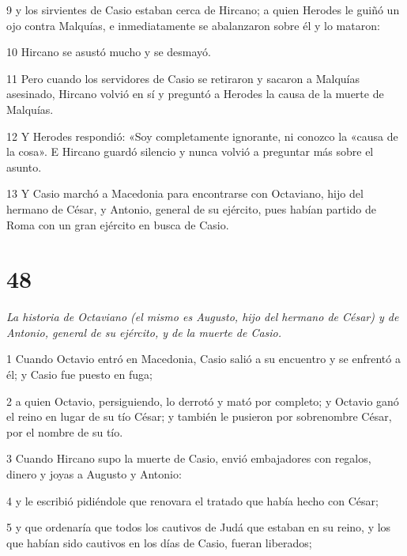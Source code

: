 \par 9 y los sirvientes de Casio estaban cerca de Hircano; a quien Herodes le guiñó un ojo contra Malquías, e inmediatamente se abalanzaron sobre él y lo mataron:

\par 10 Hircano se asustó mucho y se desmayó.

\par 11 Pero cuando los servidores de Casio se retiraron y sacaron a Malquías asesinado, Hircano volvió en sí y preguntó a Herodes la causa de la muerte de Malquías.

\par 12 Y Herodes respondió: «Soy completamente ignorante, ni conozco la «causa de la cosa». E Hircano guardó silencio y nunca volvió a preguntar más sobre el asunto.

\par 13 Y Casio marchó a Macedonia para encontrarse con Octaviano, hijo del hermano de César, y Antonio, general de su ejército, pues habían partido de Roma con un gran ejército en busca de Casio.

\chapter{48}

\par \textit{La historia de Octaviano (el mismo es Augusto, hijo del hermano de César) y de Antonio, general de su ejército, y de la muerte de Casio.}

\par 1 Cuando Octavio entró en Macedonia, Casio salió a su encuentro y se enfrentó a él; y Casio fue puesto en fuga;

\par 2 a quien Octavio, persiguiendo, lo derrotó y mató por completo; y Octavio ganó el reino en lugar de su tío César; y también le pusieron por sobrenombre César, por el nombre de su tío.

\par 3 Cuando Hircano supo la muerte de Casio, envió embajadores con regalos, dinero y joyas a Augusto y Antonio:

\par 4 y le escribió pidiéndole que renovara el tratado que había hecho con César;

\par 5 y que ordenaría que todos los cautivos de Judá que estaban en su reino, y los que habían sido cautivos en los días de Casio, fueran liberados;

